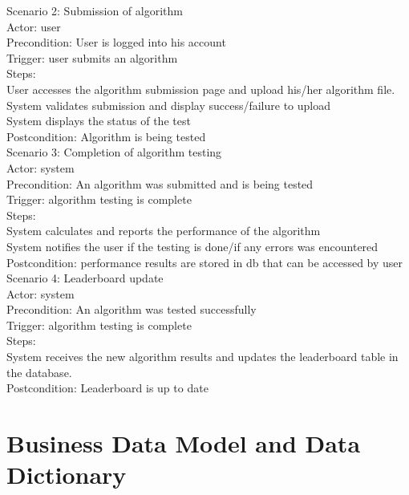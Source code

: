 \documentclass[12pt]{article}
\begin{document}
\noindent    Scenario 2: Submission of algorithm \\
	Actor: user \\
	Precondition: User is logged into his account \\
	Trigger: user submits an algorithm \\
	Steps: \\
User accesses the algorithm submission page and upload his/her algorithm file. \\
System validates submission and display success/failure to upload \\
System displays the status of the test \\
	Postcondition: Algorithm is being tested \\

\noindent  Scenario 3: Completion of algorithm testing \\
Actor: system \\
	Precondition: An algorithm was submitted and is being tested \\
	Trigger: algorithm testing is complete \\
	Steps: \\
System calculates and reports the performance of the algorithm \\
System notifies the user if the testing is done/if any errors was encountered \\
	Postcondition: performance results are stored in db that can be accessed by user \\

\noindent  Scenario 4: Leaderboard update \\
Actor: system \\
	Precondition: An algorithm was tested successfully \\
	Trigger: algorithm testing is complete \\
	Steps: \\
System receives the new algorithm results and updates the leaderboard table in the database. \\
	Postcondition: Leaderboard is up to date \\


\section{Business Data Model and Data Dictionary}
\end{document}

